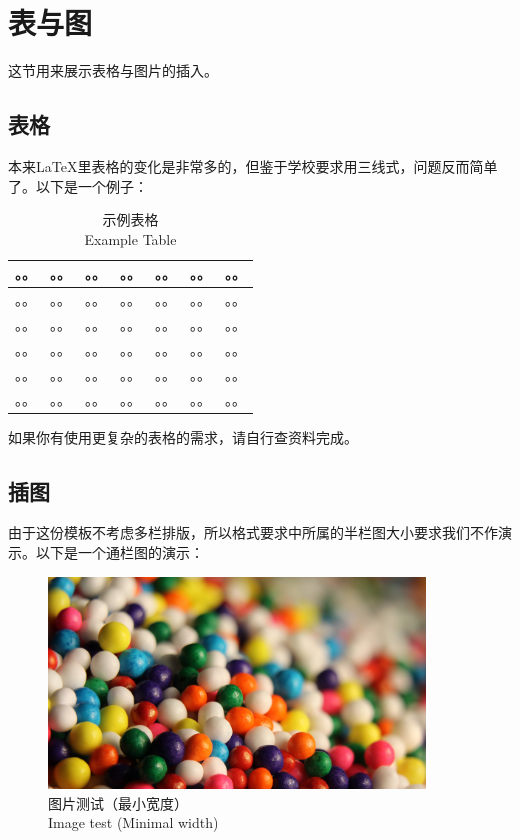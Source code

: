 \section{表与图}这节用来展示表格与图片的插入。

\subsection{表格}
\par 本来LaTeX里表格的变化是非常多的，但鉴于学校要求用三线式，问题反而简单了。以下是一个例子：
\begin{table}[htbp]\center
    \caption{示例表格\\Example Table}
    \begin{tabular}{lcccccl}
     \toprule
     。。 & 。。 & 。。 & 。。 & 。。& 。。 & 。。\\
     \midrule
    。。 & 。。 & 。。 & 。。 & 。。& 。。 & 。。\\
    。。 & 。。 & 。。 & 。。 & 。。& 。。 & 。。\\
    。。 & 。。 & 。。 & 。。 & 。。& 。。 & 。。\\
    。。 & 。。 & 。。 & 。。 & 。。& 。。 & 。。\\
    。。 & 。。 & 。。 & 。。 & 。。& 。。 & 。。\\
     \bottomrule
    \end{tabular}
   \end{table}
如果你有使用更复杂的表格的需求，请自行查资料完成。

\subsection{插图}
由于这份模板不考虑多栏排版，所以格式要求中所属的半栏图大小要求我们不作演示。以下是一个通栏图的演示：
\begin{figure}[H]
    \centering
    \includegraphics[width=100mm]{./figures/figure_example1.jpg}
    \caption{图片测试（最小宽度）\\Image test (Minimal width)}
  \end{figure}

